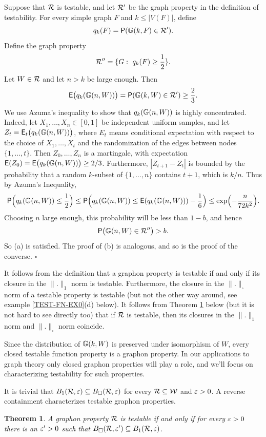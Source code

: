 \documentclass{article}
\newtheorem{theorem}{Theorem}[section]
\newenvironment{proof}{\medskip\noindent{\bf Proof. }}{\hfill$\square$\medskip}
\begin{document}
\begin{proof}
Suppose that $\mathcal{R}$ is testable, and let $\mathcal{R}'$ be the graph property
in the definition of testability. For every simple graph $F$ and
$k\le |V(F)|$, define
\[
q_k(F)={\sf P}({\mathbb G}(k,F)\in\mathcal{R}').
\]
Define the graph property
\[
\mathcal{R}''=\{G:~q_k(F) \ge \frac12\}.
\]
Let $W\in\mathcal{R}$ and let $n>k$ be large enough. Then
\[
{\sf E}\bigl(q_k({\mathbb G}(n,W))\bigr)={\sf P}({\mathbb G}(k,W)\in\mathcal{R}') \ge \frac23.
\]
We use Azuma's inequality to show that $q_k({\mathbb G}(n,W))$ is highly
concentrated. Indeed, let $X_1,\dots,X_n\in[0,1]$ be independent
uniform samples, and let $Z_t={\sf E}_t\bigl(q_k({\mathbb G}(n,W))\bigr)$, where
$E_t$ means conditional expectation with respect to the choice of
$X_1,\dots,X_t$ and the randomization of the edges between nodes
$\{1,\dots,t\}$. Then $Z_0,\dots,Z_n$ is a martingale, with
expectation ${\sf E}(Z_0)={\sf E}\bigl(q_k({\mathbb G}(n,W))\bigr)\ge 2/3$.
Furthermore, $|Z_{t+1}-Z_t|$ is bounded by the probability that a
random $k$-subset of $\{1,\dots,n\}$ contains $t+1$, which is $k/n$.
Thus by Azuma's Inequality,
\[
{\sf P}\Bigl(q_k({\mathbb G}(n,W)) \le \frac12\Bigr)\le {\sf P}\Bigl(q_k({\mathbb G}(n,W))\le
{\sf E}(q_k({\mathbb G}(n,W)))-\frac16\Bigr) \le \exp\Bigl(-\frac{n}{72k^2}\Bigr).
\]
Choosing $n$ large enough, this probability will be less than $1-b$,
and hence
\[
{\sf P}\bigl({\mathbb G}(n,W)\in\mathcal{R}''\bigr) >b.
\]
So (a) is satisfied. The proof of (b) is analogous, and so is the
proof of the converse.
\end{proof}


It follows from the definition that a graphon property is testable if
and only if its closure in the $\|.\|_1$ norm is testable.
Furthermore, the closure in the $\|.\|_\square$ norm of a testable
property is testable (but not the other way around, see example
\ref{TEST-FN-EX0}(d) below). It follows from Theorem
\ref{PROPTEST-FN} below (but it is not hard to see directly too) that
if $\mathcal{R}$ is testable, then its closures in the $\|.\|_1$ norm and
$\|.\|_\square$ norm coincide.

Since the distribution of ${\mathbb G}(k,W)$ is preserved under isomorphism
of $W$, every closed testable function property is a graphon
property. In our applications to graph theory only closed graphon
properties will play a role, and we'll focus on characterizing
testability for such properties.

It is trivial that $B_1(\mathcal{R},\varepsilon)\subseteq B_\square(\mathcal{R},\varepsilon)$ for
every $\mathcal{R}\subseteq\mathcal{W}$ and $\varepsilon>0$. A reverse containment
characterizes testable graphon properties.

\begin{theorem}\label{PROPTEST-FN}
A graphon property $\mathcal{R}$ is testable if and only if for every
$\varepsilon>0$ there is an $\varepsilon'>0$ such that $B_{\square}(\mathcal{R},\varepsilon')
\subseteq B_1(\mathcal{R},\varepsilon)$.
\end{theorem}
\end{document}
